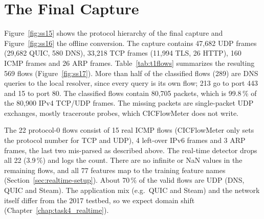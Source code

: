 \section{The Final Capture}\label{sec:final-capture}

Figure~\ref{fig:ss15} shows the protocol hierarchy of the final capture and Figure~\ref{fig:ss16} the offline conversion. The capture contains 47,682 UDP frames (29,682 QUIC, 580 DNS), 33,218 TCP frames (11,994 TLS, 26 HTTP), 160 ICMP frames and 26 ARP frames. Table~\ref{tab:t1flows} summarizes the resulting 569 flows (Figure~\ref{fig:ss17}). More than half of the classified flows (289) are DNS queries to the local resolver, since every query is its own flow; 213 go to port 443 and 15 to port 80. The classified flows contain 80,705 packets, which is 99.8\,\% of the 80,900 IPv4 TCP/UDP frames. The missing packets are single-packet UDP exchanges, mostly traceroute probes, which CICFlowMeter does not write.

\begin{table}[ht]
	\centering\small
	
	\caption{Flows of \texttt{task2\_lab2.pcap\_Flow.csv}. The 22 flows with protocol 0 are not TCP/UDP flows and are dropped before classification.}
	\label{tab:t1flows}
\end{table}

The 22 protocol-0 flows consist of 15 real ICMP flows (CICFlowMeter only sets the protocol number for TCP and UDP), 4 left-over IPv6 frames and 3 ARP frames, the last two mis-parsed as described above. The real-time detector drops all 22 (3.9\,\%) and logs the count. There are no infinite or NaN values in the remaining flows, and all 77 features map to the training feature names (Section~\ref{sec:realtime-setup}). About 70\,\% of the valid flows are UDP (DNS, QUIC and Steam). The application mix (e.g.\ QUIC and Steam) and the network itself differ from the 2017 testbed, so we expect domain shift (Chapter~\ref{chap:task4_realtime}).


\FloatBarrier

